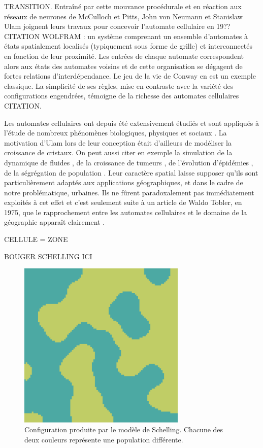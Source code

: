 \documentclass[12pt]{article}
\begin{document}
TRANSITION. Entraîné par cette mouvance procédurale et en réaction aux
réseaux de neurones de McCulloch et Pitts, John von Neumann et
Stanislaw Ulam joignent leurs travaux pour concevoir l'automate
cellulaire en 19??  CITATION WOLFRAM : un système comprenant un
ensemble d'automates à états spatialement localisés (typiquement sous
forme de grille) et interconnectés en fonction de leur proximité. Les
entrées de chaque automate correspondent alors aux états des automates
voisins et de cette organisation se dégagent de fortes relations
d'interdépendance. Le jeu de la vie de Conway en est un exemple
classique. La simplicité de ses règles, mise en contraste avec la
variété des configurations engendrées, témoigne de la richesse des
automates cellulaires CITATION.

Les automates cellulaires ont depuis été extensivement étudiés et sont
appliqués à l'étude de nombreux phénomènes biologiques, physiques et
sociaux \cite{Ganguly2003}. La motivation d'Ulam lors de leur conception
était d'ailleurs de modéliser la croissance de cristaux. On peut aussi
citer en exemple la simulation de la dynamique de fluides
\cite{Frisch1986}, de la croissance de tumeurs \cite{Kansal2000}, de
l'évolution d'épidémies \cite{Fu2003}, de la ségrégation de population
\cite{Schelling1969}. Leur caractère spatial laisse supposer qu'ils
sont particulièrement adaptés aux applications géographiques, et dans
le cadre de notre problématique, urbaines. Ils ne fûrent
paradoxalement pas immédiatement exploités à cet effet et c'est
seulement suite à un article de Waldo Tobler, en 1975, que le
rapprochement entre les automates cellulaires et le domaine de la
géographie apparaît clairement \cite{Tobler1975}.

CELLULE = ZONE

BOUGER SCHELLING ICI

\begin{figure}
  \centering
  \includegraphics[width=8cm]{images/schelling.png}
  \caption{Configuration produite par le modèle de Schelling. Chacune
    des deux couleurs représente une population différente.}
  \label{fig:schelling}
\end{figure}
\end{document}
